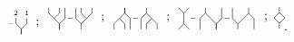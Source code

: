 \begin{equation*}
\begin{tikzpicture}[scale=.15]
\draw node[scale=.8] at (8,2){$\scriptstyle -$};

\draw node[scale=.8] at (9,4){$\scriptstyle 2$};
\draw node[scale=.8] at (11,4){$\scriptstyle 1$};
\draw (9,3)--(9,2)--(10,1)--(10,0);
\draw (11,3)--(11,2)--(10,1)--(10,0);

\node at (13,2){;};
\end{tikzpicture} 
\begin{tikzpicture}[scale=.15]
\node at (4.8,4.2){};
\node at (4.8,-.2){};

\draw (7,4)--(7,3)--(6,2);
\draw (5,4)--(5,3)--(7,1)--(7,0);
\draw (8,4)--(8,2)--(7,1)--(7,0);

\draw node[scale=.8] at (9,2){$\scriptstyle -$};

\draw (10,4)--(10,2)--(11,1)--(11,0);
\draw (13,4)--(13,3)--(11,1);
\draw (11,4)--(11,3)--(12,2);

\node at (15,2){;};
\end{tikzpicture} 
\begin{tikzpicture}[scale=.15]
\node at (4.8,-4.2){};
\node at (4.8,.2){};

\draw (7,-4)--(7,-3)--(6,-2);
\draw (5,-4)--(5,-3)--(7,-1)--(7,0);
\draw (8,-4)--(8,-2)--(7,-1)--(7,0);

\draw node[scale=.8] at (9,-2){$\scriptstyle -$};

\draw (10,-4)--(10,-2)--(11,-1)--(11,0);
\draw (13,-4)--(13,-3)--(11,-1);
\draw (11,-4)--(11,-3)--(12,-2);

\node at (15,-2){;};
\end{tikzpicture}\
\begin{tikzpicture}[scale=.15]
\draw (0,4)--(1,3)--(1,1)--(0,0);
\draw (2,4)--(1,3);
\draw (1,1)--(2,0);

\draw node[scale=.8] at (2.7,2){$\scriptstyle -$};

\draw (5,4)--(5,3)--(4,2)--(4,0);
\draw (5,3)--(7,1)--(7,0);
\draw (8,4)--(8,2)--(7,1)--(7,0);

\draw node[scale=.8] at (9,2){$\scriptstyle -$};

\draw (10,4)--(10,2)--(11,1)--(11,0);
\draw (13,4)--(13,3)--(11,1);
\draw (13,3)--(14,2)--(14,0);

\node at (4.8,4.2){};
\node at (14.3,-.2){};
\end{tikzpicture}
\begin{tikzpicture}[scale=.15]
\node at (-1.5,2){;};
\draw (1,4)--(1,3)--(0,2)--(1,1)--(1,0);
\draw (1,3)--(2,2)--(1,1);

\node at (2.2,4.2){};
\node at(2.2,-.2){.};
\end{tikzpicture}
\end{equation*}	

